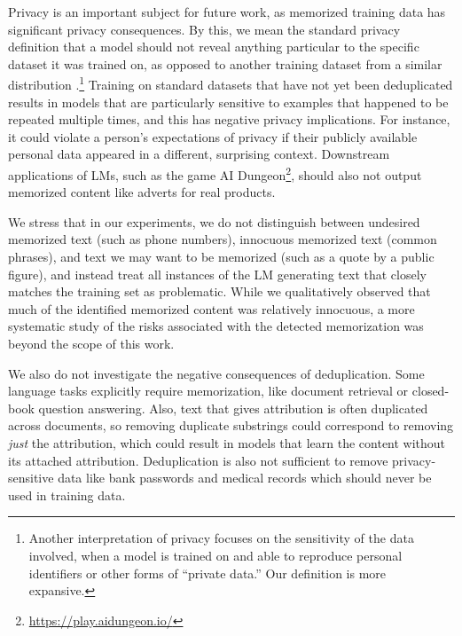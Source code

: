 Privacy is an important subject for future work, as memorized training data has significant privacy consequences.
By this, we mean the standard privacy definition that a model should not reveal anything particular to the specific dataset it was trained on, as opposed to another training dataset from a similar distribution \citep{shokri2017membership}.\footnote{%
Another interpretation of privacy focuses on the sensitivity of the data involved, when a model is trained on and able to reproduce personal identifiers or other forms of ``private data.'' Our definition is more expansive.}
Training on standard datasets that have not yet been deduplicated results in models that are particularly sensitive to examples that happened to be repeated multiple times, and this has negative privacy implications.
For instance, it could violate a person's expectations of privacy if their publicly available personal data appeared in a different, surprising context.
Downstream applications of LMs, such as the game AI Dungeon\footnote{\url{https://play.aidungeon.io/}}, should also not output memorized content like adverts for real products. 

We stress that in our experiments, we do not distinguish between undesired memorized text (such as phone numbers), innocuous memorized text (common phrases), and text we may want to be memorized (such as a quote by a public figure), and instead treat all instances of the LM generating text that closely matches the training set as problematic.
While we qualitatively observed that much of the identified memorized content was relatively innocuous, a more systematic study of the risks associated with the detected memorization was beyond the scope of this work.

We also do not investigate the negative consequences of deduplication.
Some language tasks explicitly require memorization, like document retrieval or closed-book question answering. 
Also, text that gives attribution is often duplicated across documents, so
removing duplicate substrings could correspond to removing \emph{just} the attribution, which could result in models that learn the content without its attached attribution.
Deduplication is also not sufficient to remove privacy-sensitive data like bank passwords and medical records which should never be used in training data.

